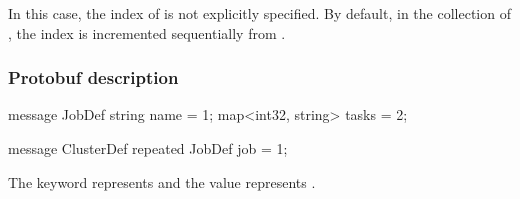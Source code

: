 \begin{content}
In this case, the index of  is not explicitly specified. By default, in the  collection of , the  index is incremented sequentially from .


\subsubsection{Protobuf description}

\begin{leftbar}
\begin{python}
message JobDef {
  string name = 1;
  map<int32, string> tasks = 2;
}

message ClusterDef {
  repeated JobDef job = 1;
}
\end{python}
\end{leftbar}

The  keyword represents  and the value represents .

\end{content}


